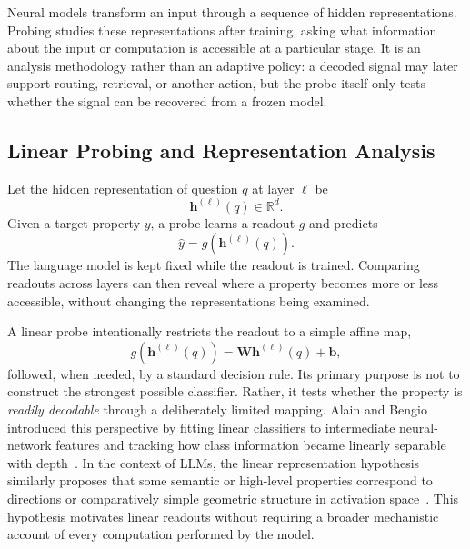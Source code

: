 Neural models transform an input through a sequence of hidden representations.
Probing studies these representations after training, asking what information
about the input or computation is accessible at a particular stage. It is an
analysis methodology rather than an adaptive policy: a decoded signal may later
support routing, retrieval, or another action, but the probe itself only tests
whether the signal can be recovered from a frozen model.

\subsection{Linear Probing and Representation Analysis}
\label{subsec:linear-probing}

Let the hidden representation of question \(q\) at layer \(\ell\) be
\begin{equation}
  \mathbf{h}^{(\ell)}(q)\in\mathbb{R}^{d}.
  \label{eq:question-representation}
\end{equation}
Given a target property \(y\), a probe learns a readout \(g\) and predicts
\begin{equation}
  \widehat{y}
  =g\!\left(\mathbf{h}^{(\ell)}(q)\right).
  \label{eq:probe-readout}
\end{equation}
The language model is kept fixed while the readout is trained. Comparing
readouts across layers can then reveal where a property becomes more or less
accessible, without changing the representations being examined.

A linear probe intentionally restricts the readout to a simple affine map,
\begin{equation}
  g\!\left(\mathbf{h}^{(\ell)}(q)\right)
  =\mathbf{W}\mathbf{h}^{(\ell)}(q)+\mathbf{b},
  \label{eq:linear-probe}
\end{equation}
followed, when needed, by a standard decision rule. Its primary purpose is not
to construct the strongest possible classifier. Rather, it tests whether the
property is \emph{readily decodable} through a deliberately limited mapping.
Alain and Bengio introduced this perspective by fitting linear classifiers to
intermediate neural-network features and tracking how class information became
linearly separable with depth~\cite{alain2016probes}. In the context of LLMs,
the linear representation hypothesis similarly proposes that some semantic or
high-level properties correspond to directions or comparatively simple
geometric structure in activation space~\cite{park2024linear}. This hypothesis
motivates linear readouts without requiring a broader mechanistic account of
every computation performed by the model.

